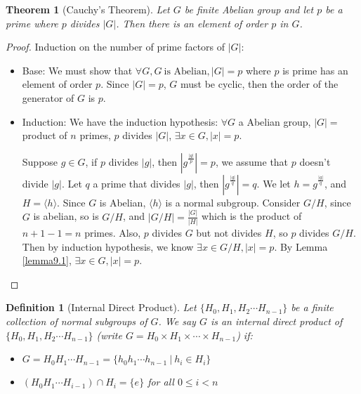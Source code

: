 \documentclass[14pt]{extarticle}
\newtheorem{theorem}{Theorem}[section]
\newtheorem{definition}{Definition}[section]
\begin{document}
\begin{theorem}[Cauchy's Theorem]
  Let $G$ be finite Abelian group and let $p$ be a prime where $p$ divides $|G|$.
  Then there is an element of order $p$ in $G$.
\end{theorem}
\begin{proof}
  Induction on the number of prime factors of $|G|$:
  \begin{itemize}
    \item Base: We must show that $\forall G, G \ \text{is Abelian}, |G| = p$ where $p$ is prime has an element of order $p$.
      Since $|G| = p$, $G$ must be cyclic, then the order of the generator of $G$ is $p$.
    \item Induction: We have the induction hypothesis: 
      $\forall G$ a Abelian group, $|G| =$ product of $n$ primes,
      $p$ divides $|G|$,
      $\exists x \in G, |x| = p$.

      Suppose $g \in G$, if $p$ divides $|g|$, then $|g^\frac{|g|}{p}| = p$, 
      we assume that $p$ doesn't divide $|g|$.
      Let $q$ a prime that divides $|g|$, then $|g^\frac{|g|}{q}| = q$.
      We let $h = g^\frac{|g|}{q}$, and $H = \langle h \rangle$.
      Since $G$ is Abelian, $\langle h \rangle$ is a normal subgroup.
      Consider $G/H$, since $G$ is abelian, so is $G/H$,
      and $|G/H| = \frac{|G|}{|H|}$ which is the product of $n + 1 - 1 = n$ primes.
      Also, $p$ divides $G$ but not divides $H$, so $p$ divides $G/H$.
      Then by induction hypothesis, we know $\exists x \in G/H, |x| = p$.
      By Lemma \ref{lemma9.1}, $\exists x \in G, |x| = p$.
  \end{itemize}
\end{proof}

\begin{definition}[Internal Direct Product]
  Let $\{ H_0 , H_1 , H_2 \cdots H_{n-1} \}$ be a finite collection of normal subgroups of $G$.
  We say $G$ is an internal direct product of $\{ H_0 , H_1 , H_2 \cdots H_{n-1} \}$
  (write $G = H_0 \times H_1 \times \cdots \times H_{n-1}$) if:
  \begin{itemize}
    \item $G = H_0H_1 \cdots H_{n-1} = \{ h_0h_1 \cdots h_{n-1} \ | \ h_i \in H_i \}$
    \item $(H_0H_1 \cdots H_{i - 1}) \cap H_i = \{ e \}$ for all $0 \le i < n$
  \end{itemize}
\end{definition}
\end{document}
